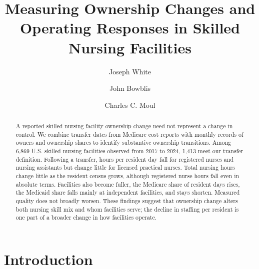 \documentclass[12pt]{article}
\begin{document}
\begin{titlepage}
\title{Measuring Ownership Changes and Operating Responses in Skilled Nursing Facilities}

\author{
  Joseph White
  \and
  John Bowblis
  \and
  Charles C. Moul
}

\date{\DTMtoday}

\maketitle

\begin{abstract}
\noindent A reported skilled nursing facility ownership change need not represent a change in control. We combine transfer dates from Medicare cost reports with monthly records of owners and ownership shares to identify substantive ownership transitions. Among 6,869 U.S. skilled nursing facilities observed from 2017 to 2024, 1,413 meet our transfer definition. Following a transfer, hours per resident day fall for registered nurses and nursing assistants but change little for licensed practical nurses. Total nursing hours change little as the resident census grows, although registered nurse hours fall even in absolute terms. Facilities also become fuller, the Medicare share of resident days rises, the Medicaid share falls mainly at independent facilities, and stays shorten. Measured quality does not broadly worsen. These findings suggest that ownership change alters both nursing skill mix and whom facilities serve; the decline in staffing per resident is one part of a broader change in how facilities operate.


\bigskip
\end{abstract}
\setcounter{page}{0}
\thispagestyle{empty}
\end{titlepage}
\pagebreak \newpage

\doublespacing

\section{Introduction} \label{sec:introduction}
\end{document}
